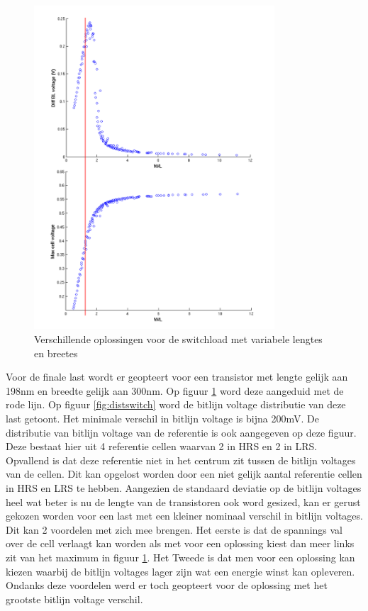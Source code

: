 \begin{figure}[!ht]
  \centering
  \includegraphics[width=0.80\textwidth]{../fig/hfdst-last-length.png}
  \caption{Verschillende oplossingen voor de switchload met variabele lengtes en breetes}
  \label{fig:length}
\end{figure}

Voor de finale last wordt er geopteert voor een transistor met lengte gelijk aan 198nm en breedte gelijk aan 300nm. Op figuur \ref{fig:length} word deze aangeduid met de rode lijn. Op figuur \ref{fig:distswitch} word de bitlijn voltage distributie van deze last getoont. Het minimale verschil in bitlijn voltage is bijna 200mV. De distributie van bitlijn voltage van de referentie is ook aangegeven op deze figuur. Deze bestaat hier uit 4 referentie cellen waarvan 2 in HRS en 2 in LRS. Opvallend is dat deze referentie niet in het centrum zit tussen de bitlijn voltages van de cellen. Dit kan opgelost worden door een niet gelijk aantal referentie cellen in HRS en LRS te hebben. Aangezien de standaard deviatie op de bitlijn voltages heel wat beter is nu de lengte van de transistoren ook word gesized, kan er gerust gekozen worden voor een last met een kleiner nominaal verschil in bitlijn voltages. Dit kan 2 voordelen met zich mee brengen. Het eerste is dat de spannings val over de cell verlaagt kan worden als met voor een oplossing kiest dan meer links zit van het maximum in figuur \ref{fig:length}. Het Tweede is dat men voor een oplossing kan kiezen waarbij de bitlijn voltages lager zijn wat een energie winst kan opleveren. Ondanks deze voordelen werd er toch geopteert voor de oplossing met het grootste bitlijn voltage verschil.

